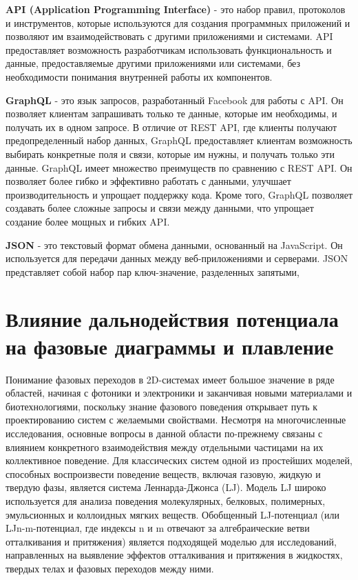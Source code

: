 \textbf{API (Application Programming Interface)} - это набор правил, протоколов и инструментов, 
которые используются для создания программных приложений и позволяют им взаимодействовать с другими приложениями и системами. 
API предоставляет возможность разработчикам использовать функциональность и данные, 
предоставляемые другими приложениями или системами, 
без необходимости понимания внутренней работы их компонентов.

\textbf{GraphQL} - это язык запросов, разработанный Facebook для работы с API. 
Он позволяет клиентам запрашивать только те данные, которые им необходимы, и получать их в одном запросе. 
В отличие от REST API, где клиенты получают предопределенный набор данных, 
GraphQL предоставляет клиентам возможность выбирать конкретные поля и связи, 
которые им нужны, и получать только эти данные.
GraphQL имеет множество преимуществ по сравнению с REST API. 
Он позволяет более гибко и эффективно работать с данными, 
улучшает производительность и упрощает поддержку кода. Кроме того, 
GraphQL позволяет создавать более сложные запросы и связи между данными, 
что упрощает создание более мощных и гибких API.

\textbf{JSON} - это текстовый формат обмена данными, основанный на JavaScript.
Он используется для передачи данных между веб-приложениями и серверами.
JSON представляет собой набор пар ключ-значение, разделенных запятыми,
















\section{Влияние дальнодействия потенциала на фазовые диаграммы и плавление}

Понимание фазовых переходов в 2D-системах имеет большое значение в ряде областей, начиная с фотоники и электроники  и заканчивая новыми материалами и биотехнологиями, поскольку знание фазового поведения открывает путь к проектированию систем с желаемыми свойствами. 
Несмотря на многочисленные исследования, основные вопросы в данной области по-прежнему связаны с влиянием конкретного взаимодействия между отдельными частицами на их коллективное поведение. 
Для классических систем одной из простейших моделей, способных воспроизвести поведение веществ, включая газовую, жидкую и твердую фазы, является система Леннарда-Джонса (LJ). 
Модель LJ широко используется для анализа поведения молекулярных, белковых, полимерных, эмульсионных и коллоидных мягких веществ. 
Обобщенный LJ-потенциал (или LJn-m-потенциал, где индексы n и m отвечают за алгебраические ветви отталкивания и притяжения) является подходящей моделью для исследований, направленных на выявление эффектов отталкивания и притяжения в жидкостях, твердых телах и фазовых переходов между ними.

